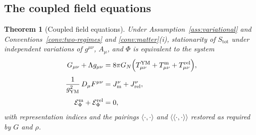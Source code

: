 \documentclass[11pt,a4paper]{article}
\theoremstyle{plain}
\newtheorem{theorem}{Theorem}[section]
\theoremstyle{definition}
\theoremstyle{remark}
\begin{document}
\subsection{The coupled field equations}

\begin{theorem}[Coupled field equations]
\label{thm:field-eqs}
Under Assumption~\ref{ass:variational} and Conventions~\ref{conv:two-regimes} and
\ref{conv:matter}(i), stationarity of $S_{\mathrm{tot}}$ under independent variations of
$g^{\mu\nu}$, $A_\mu$, and $\Phi$ is equivalent to the system
\begin{align}
\label{eq:einstein}
G_{\mu\nu}+\Lambda g_{\mu\nu}
&=8\pi G_N\Bigl(
T^{\mathrm{YM}}_{\mu\nu}+T^{\mathrm{m}}_{\mu\nu}+T^{\mathrm{rel}}_{\mu\nu}
\Bigr),
\\[0.35em]
\label{eq:ym}
\frac{1}{g_{\mathrm{YM}}^{2}}\,D_\mu F^{\mu\nu}
&=J^{\nu}_{\mathrm{m}}+J^{\nu}_{\mathrm{rel}},
\\[0.35em]
\label{eq:matter}
\mathcal{E}^{\mathrm{m}}_{\Phi}+\mathcal{E}^{\mathrm{rel}}_{\Phi}
&=0,
\end{align}
with representation indices and the pairings $\langle\cdot,\cdot\rangle$ and
$\langle\!\langle\cdot,\cdot\rangle\!\rangle$ restored as required by $G$ and $\rho$.
\end{theorem}
\end{document}
